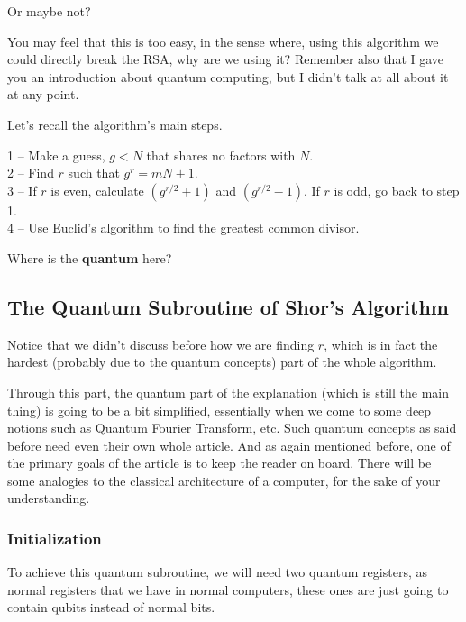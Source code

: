 Or maybe not?

You may feel that this is too easy, in the sense where, using this algorithm
we could directly break the RSA, why are we using it? Remember also that I
gave you an introduction about quantum computing, but I didn't talk at all
about it at any point.

Let's recall the algorithm's main steps.

\begin{tcolorbox}[colframe=smjcrimson, colback=smjlightcrimson,
                  sharp corners, boxrule=0.5pt, breakable]
1 -- Make a guess, $g < N$ that shares no factors with $N$.\\[0.5em]
2 -- Find $r$ such that $g^r = mN + 1$.\\[0.5em]
3 -- If $r$ is even, calculate $(g^{r/2} + 1)$ and $(g^{r/2} - 1)$.
     If $r$ is odd, go back to step 1.\\[0.5em]
4 -- Use Euclid's algorithm to find the greatest common divisor.
\end{tcolorbox}

Where is the \textbf{quantum} here?

\subsection{The Quantum Subroutine of Shor's Algorithm}

Notice that we didn't discuss before how we are finding $r$, which is in fact
the hardest (probably due to the quantum concepts) part of the whole algorithm.

\begin{smjnote}
Through this part, the quantum part of the explanation (which is still the
main thing) is going to be a bit simplified, essentially when we come to some
deep notions such as Quantum Fourier Transform, etc. Such quantum concepts as
said before need even their own whole article. And as again mentioned before,
one of the primary goals of the article is to keep the reader on board.
There will be some analogies to the classical architecture of a computer, for
the sake of your understanding.
\end{smjnote}

\subsubsection{Initialization}

To achieve this quantum subroutine, we will need two quantum registers, as
normal registers that we have in normal computers, these ones are just going
to contain qubits instead of normal bits.

